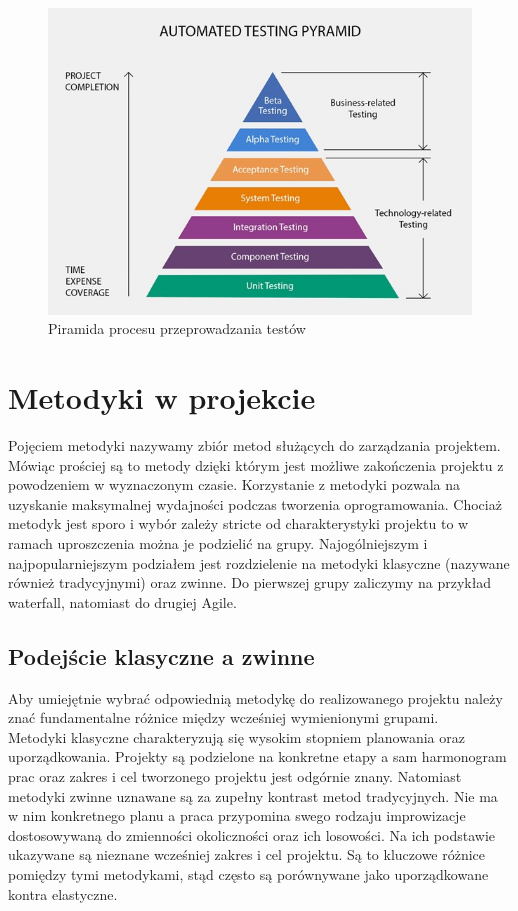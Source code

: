 \documentclass[oneside,polski,logo]{amuthesis}
\begin{document}
\begin{figure}[h]
	\centering
	\includegraphics[width=15cm]{images/hyps/test-diagram.jpg}
	\caption{Piramida procesu przeprowadzania testów}
\end{figure}

\section {Metodyki w projekcie}
Pojęciem metodyki nazywamy zbiór metod służących do zarządzania projektem. Mówiąc prościej są to metody dzięki którym jest możliwe zakończenia projektu z powodzeniem w wyznaczonym czasie. Korzystanie z metodyki pozwala na uzyskanie maksymalnej wydajności podczas tworzenia oprogramowania. Chociaż metodyk jest sporo i wybór zależy stricte od charakterystyki projektu to w ramach uproszczenia można je podzielić na grupy.  Najogólniejszym i najpopularniejszym podziałem jest rozdzielenie na metodyki klasyczne (nazywane również tradycyjnymi) oraz zwinne. Do pierwszej grupy zaliczymy na przykład waterfall, natomiast do drugiej Agile.\\

\subsection {Podejście klasyczne a zwinne}
Aby umiejętnie wybrać odpowiednią metodykę do realizowanego projektu należy znać fundamentalne różnice między wcześniej wymienionymi grupami. \\

Metodyki klasyczne charakteryzują się wysokim stopniem planowania oraz uporządkowania. Projekty są podzielone na konkretne etapy a sam harmonogram prac oraz zakres i cel tworzonego projektu jest odgórnie znany. Natomiast metodyki zwinne uznawane są za zupełny kontrast metod tradycyjnych. Nie ma w nim konkretnego planu a praca przypomina swego rodzaju improwizacje dostosowywaną do zmienności okoliczności oraz ich losowości. Na ich podstawie ukazywane są nieznane wcześniej zakres i cel projektu. Są to kluczowe różnice pomiędzy tymi metodykami, stąd często są porównywane jako uporządkowane kontra elastyczne.\\
\end{document}
